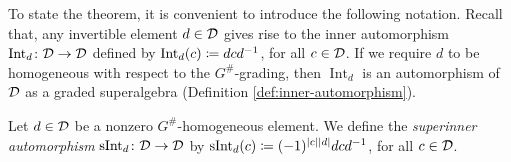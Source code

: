 
To state the theorem, it is convenient to introduce the following notation. 
Recall that, any invertible element $d\in \mathcal{D}$ gives rise to the inner automorphism $\operatorname{Int}_d\colon \mathcal{D} \to \mathcal{D}$ defined by $\operatorname{Int}_d (c) \coloneqq dcd^{-1}$, for all $c\in \mathcal{D}$. 
If we require $d$ to be homogeneous with respect to the $G^\#$-grading, then $\operatorname{Int}_d$ is an automorphism of $\mathcal{D}$ as a graded superalgebra (Definition \ref{def:inner-automorphism}).

\begin{defi}
    Let $d\in \mathcal{D}$ be a nonzero $G^\#$-homogeneous element. 
    We define the \emph{superinner automorphism} $\operatorname{sInt}_d\colon \mathcal{D} \to \mathcal{D}$ by $\operatorname{sInt}_d (c) \coloneqq (-1)^{|c||d|} dcd^{-1}$, for all $c\in \mathcal{D}$.
\end{defi}





